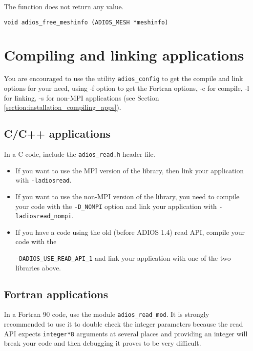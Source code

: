 \noindent The function does not return any value.

\begin{lstlisting}
void adios_free_meshinfo (ADIOS_MESH *meshinfo)
\end{lstlisting}

\section{Compiling and linking applications}

You are encouraged to use the utility \verb+adios_config+ to get the compile and link options for your 
need, using -f option to get the Fortran options, -c for compile, -l for linking, 
-s for non-MPI applications (see Section \ref{section:installation_compiling_apps}). 


\subsection{C/C++ applications}

In a C code, include the \verb+adios_read.h+ header file.  

\begin{itemize}
\item If you want to use the MPI version of the library, then link your application with \verb+-ladiosread+.

\item If you want to use the non-MPI version of the library, you need to compile your 
code with the \verb+-D_NOMPI+ option and link your application with \verb+-ladiosread_nompi+.

\item If you have a code using the old (before ADIOS 1.4) read API, compile your code with the

\verb+-DADIOS_USE_READ_API_1+ and link your application with one of the two libraries above.

\end{itemize}

\subsection{Fortran applications}

In a Fortran 90 code,  use the module 
\verb+adios_read_mod+. It is strongly recommended to use it to double check the integer 
parameters because the read API expects \verb+integer*8+ arguments 
at several places and providing an integer will break your code and then debugging 
it proves to be very difficult.

